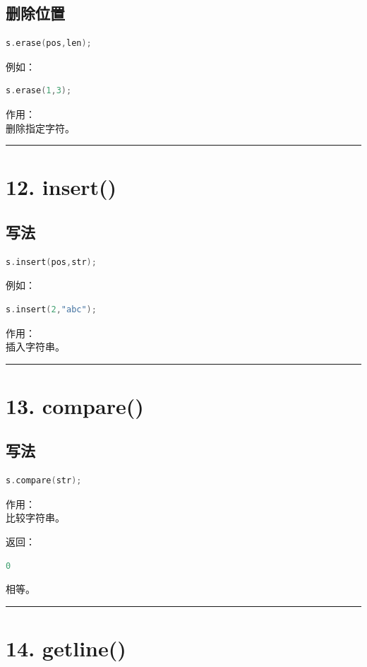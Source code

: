 \documentclass[10pt,twocolumn]{extarticle}
\begin{document}
\subsection{删除位置}
\begin{lstlisting}[language=C++]
s.erase(pos,len);
\end{lstlisting}
例如：
\begin{lstlisting}[language=C++]
s.erase(1,3);
\end{lstlisting}
作用：\\
删除指定字符。

\noindent\rule{\linewidth}{0.4pt}

\section{12. insert()}

\subsection{写法}
\begin{lstlisting}[language=C++]
s.insert(pos,str);
\end{lstlisting}
例如：
\begin{lstlisting}[language=C++]
s.insert(2,"abc");
\end{lstlisting}
作用：\\
插入字符串。

\noindent\rule{\linewidth}{0.4pt}

\section{13. compare()}

\subsection{写法}
\begin{lstlisting}[language=C++]
s.compare(str);
\end{lstlisting}
作用：\\
比较字符串。

返回：
\begin{lstlisting}[language=C++]
0
\end{lstlisting}
相等。

\noindent\rule{\linewidth}{0.4pt}

\section{14. getline()}
\end{document}
